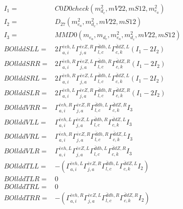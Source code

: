 \documentclass[A4,landscape]{article}
\begin{document}
\begin{align} 
I_1 = & C0D0check(m^2_{d_{{c}}}, mV22, mS12, m^2_{e_{{a}}}) \\ 
I_2 = & D_{27}(m^2_{e_{{a}}}, m^2_{d_{{c}}}, mV22, mS12) \\ 
I_3 = & MMD0(m_{e_{{a}}}, m_{d_{{c}}}, m^2_{e_{{a}}}, m^2_{d_{{c}}}, mV22, mS12) \\ 
  BOllddSLL= & 2  \Gamma^{\bar{e}e h ,L}_{a, i} \Gamma^{\bar{e}e Z ,R}_{j, a} \Gamma^{\bar{d}d h ,L}_{l, c} \Gamma^{\bar{d}d Z ,L}_{c, k} (I_1 - 2 I_2) \\ 
  BOllddSRR= & 2  \Gamma^{\bar{e}e h ,R}_{a, i} \Gamma^{\bar{e}e Z ,L}_{j, a} \Gamma^{\bar{d}d h ,R}_{l, c} \Gamma^{\bar{d}d Z ,R}_{c, k} (I_1 - 2 I_2) \\ 
  BOllddSRL= & 2  \Gamma^{\bar{e}e h ,R}_{a, i} \Gamma^{\bar{e}e Z ,L}_{j, a} \Gamma^{\bar{d}d h ,L}_{l, c} \Gamma^{\bar{d}d Z ,L}_{c, k} (I_1 - 2 I_2) \\ 
  BOllddSLR= & 2  \Gamma^{\bar{e}e h ,L}_{a, i} \Gamma^{\bar{e}e Z ,R}_{j, a} \Gamma^{\bar{d}d h ,R}_{l, c} \Gamma^{\bar{d}d Z ,R}_{c, k} (I_1 - 2 I_2) \\ 
  BOllddVRR= &  \Gamma^{\bar{e}e h ,R}_{a, i} \Gamma^{\bar{e}e Z ,R}_{j, a} \Gamma^{\bar{d}d h ,L}_{l, c} \Gamma^{\bar{d}d Z ,R}_{c, k} I_3 \\ 
  BOllddVLL= &  \Gamma^{\bar{e}e h ,L}_{a, i} \Gamma^{\bar{e}e Z ,L}_{j, a} \Gamma^{\bar{d}d h ,R}_{l, c} \Gamma^{\bar{d}d Z ,L}_{c, k} I_3 \\ 
  BOllddVRL= &  \Gamma^{\bar{e}e h ,R}_{a, i} \Gamma^{\bar{e}e Z ,R}_{j, a} \Gamma^{\bar{d}d h ,R}_{l, c} \Gamma^{\bar{d}d Z ,L}_{c, k} I_3 \\ 
  BOllddVLR= &  \Gamma^{\bar{e}e h ,L}_{a, i} \Gamma^{\bar{e}e Z ,L}_{j, a} \Gamma^{\bar{d}d h ,L}_{l, c} \Gamma^{\bar{d}d Z ,R}_{c, k} I_3 \\ 
  BOllddTLL= & -( \Gamma^{\bar{e}e h ,L}_{a, i} \Gamma^{\bar{e}e Z ,R}_{j, a} \Gamma^{\bar{d}d h ,L}_{l, c} \Gamma^{\bar{d}d Z ,L}_{c, k} I_2) \\ 
  BOllddTLR= & 0 \\ 
  BOllddTRL= & 0 \\ 
  BOllddTRR= & -( \Gamma^{\bar{e}e h ,R}_{a, i} \Gamma^{\bar{e}e Z ,L}_{j, a} \Gamma^{\bar{d}d h ,R}_{l, c} \Gamma^{\bar{d}d Z ,R}_{c, k} I_2) \\ 
\end{align} 
\end{document}
